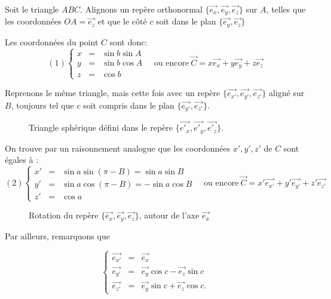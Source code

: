 \documentclass[12pt]{report}
\begin{document}
Soit le triangle $ABC$. Alignons un repère orthonormal $\{\vec{e_x},\vec{e_y},\vec{e_z}\}$ sur $A$, telles que les coordonnées  $OA=\vec{e_z}$ et que le côté $c$ soit dans le plan $\{\vec{e_y}, \vec{e_z}\}$

Les coordonnées du point $C$ sont donc:
\[
(1) \left\{ \begin{array}{lll} x &=& \sin b \sin A\\
y &=& \sin b \cos A \\
z &=& \cos b \end{array}\right. \quad \mbox{ou encore}\ \vec C = x \vec{e_x} + y \vec{e_y} + z \vec{e_z}
\]


Reprenons le même triangle, mais cette fois avec un repère $\{\vec{e_{x'}}, \vec{e_{y'}},\vec{e_{z'}}\}$ aligné sur $B$, toujours tel que $c$ soit compris dans le plan $\{\vec{e_{y'}},\vec{e_{z'}}\}$.


\bigskip\bigskip

\begin{figure}[ht]
\begin{center}
\end{center}
\caption{Triangle sphérique défini dans le repère $\{\vec{e'_x},\vec{e'_y}, \vec{e'_z}\}$.}  
\label{fig:8}
\end{figure}


\bigskip\bigskip

On trouve par un raisonnement analogue que les coordonnées $x',y',z'$ de $C$ sont égales à :
\[
(2) \left\{ \begin{array}{lll} 
x' &=& \sin a \sin(\pi - B) = \sin a \sin B\\
y' &=& \sin a \cos(\pi - B) =  - \sin a \cos B\\
z' &=& \cos a \end{array}\right. 
\quad \mbox{ou encore}\ \vec C = x' \vec{e_{x'}} + y' \vec{e_{y'}} + z' \vec{e_{z'}}
\]



\bigskip\bigskip

\begin{figure}[ht]
\begin{center}
\end{center}
\caption{Rotation du repère $\{\vec{e_x},\vec{e_y},\vec{e_z}\}$, autour de l'axe $\vec{e_x}$}
\label{fig:9}
\end{figure}
\bigskip\bigskip

Par ailleurs, remarquons que

\[
 \left\{ \begin{array}{lll} \vec{e_{x'}} &=& \vec{e_x}\\
\vec{e_{y'}} &=& \vec{e_y} \cos c - \vec{e_z} \sin c \\
\vec{e_{z'}}  &=&  \vec{e_y}  \sin c + \vec{e_z} \cos c.\end{array} \right. 
\]
\end{document}
